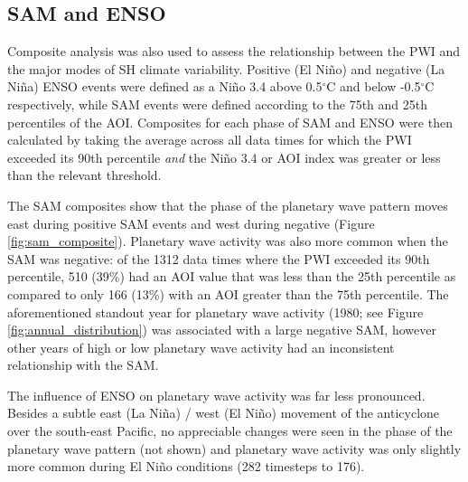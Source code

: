 \subsection{SAM and ENSO}

Composite analysis was also used to assess the relationship between the PWI and the major modes of SH climate variability. Positive (El Ni\~{n}o) and negative (La Ni\~{n}a) ENSO events were defined as a Ni\~{n}o 3.4 above 0.5$^{\circ}$C and below -0.5$^{\circ}$C respectively, while SAM events were defined according to the 75th and 25th percentiles of the AOI. Composites for each phase of SAM and ENSO were then calculated by taking the average across all data times for which the PWI exceeded its 90th percentile \textit{and} the Ni\~{n}o 3.4 or AOI index was greater or less than the relevant threshold. 

The SAM composites show that the phase of the planetary wave pattern moves east during positive SAM events and west during negative (Figure \ref{fig:sam_composite}). Planetary wave activity was also more common when the SAM was negative: of the 1312 data times where the PWI exceeded its 90th percentile, 510 (39\%) had an AOI value that was less than the 25th percentile as compared to only 166 (13\%) with an AOI greater than the 75th percentile. The aforementioned standout year for planetary wave activity (1980; see Figure \ref{fig:annual_distribution}) was associated with a large negative SAM, however other years of high or low planetary wave activity had an inconsistent relationship with the SAM.

The influence of ENSO on planetary wave activity was far less pronounced. Besides a subtle east (La Ni\~{n}a) / west (El Ni\~{n}o) movement of the anticyclone over the south-east Pacific, no appreciable changes were seen in the phase of the planetary wave pattern (not shown) and planetary wave activity was only slightly more common during El Ni\~{n}o conditions (282 timesteps to 176).      